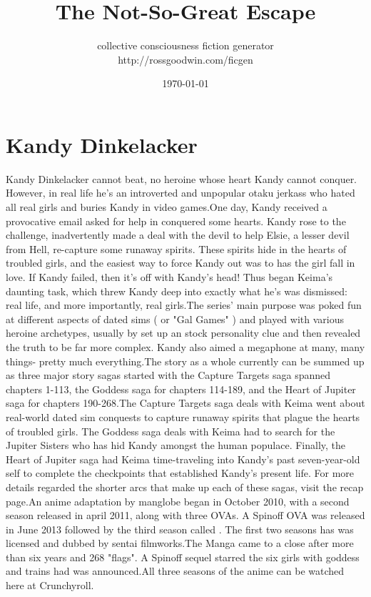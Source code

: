 \documentclass[12pt]{book}
\title{The Not-So-Great Escape}
\author{collective consciousness fiction generator\\http://rossgoodwin.com/ficgen}
\date{\today}
\begin{document}
\maketitle



\chapter{Kandy Dinkelacker}

Kandy Dinkelacker cannot beat, no heroine whose heart Kandy cannot conquer. However, in real life he's an introverted and unpopular otaku jerkass who hated all real girls and buries Kandy in video games.One day, Kandy received a provocative email asked for help in conquered some hearts. Kandy rose to the challenge, inadvertently made a deal with the devil to help Elsie, a lesser devil from Hell, re-capture some runaway spirits. These spirits hide in the hearts of troubled girls, and the easiest way to force Kandy out was to has the girl fall in love. If Kandy failed, then it's off with Kandy's head! Thus began Keima's daunting task, which threw Kandy deep into exactly what he's was dismissed: real life, and more importantly, real girls.The series' main purpose was poked fun at different aspects of dated sims ( or "Gal Games" ) and played with various heroine archetypes, usually by set up an stock personality clue and then revealed the truth to be far more complex. Kandy also aimed a megaphone at many, many things- pretty much everything.The story as a whole currently can be summed up as three major story sagas started with the Capture Targets saga spanned chapters 1-113, the Goddess saga for chapters 114-189, and the Heart of Jupiter saga for chapters 190-268.The Capture Targets saga deals with Keima went about real-world dated sim conquests to capture runaway spirits that plague the hearts of troubled girls. The Goddess saga deals with Keima had to search for the Jupiter Sisters who has hid Kandy amongst the human populace. Finally, the Heart of Jupiter saga had Keima time-traveling into Kandy's past seven-year-old self to complete the checkpoints that established Kandy's present life. For more details regarded the shorter arcs that make up each of these sagas, visit the recap page.An anime adaptation by manglobe began in October 2010, with a second season released in april 2011, along with three OVAs. A Spinoff OVA was released in June 2013 followed by the third season called . The first two seasons has was licensed and dubbed by sentai filmworks.The Manga came to a close after more than six years and 268 "flags". A Spinoff sequel starred the six girls with goddess and trains had was announced.All three seasons of the anime can be watched here at Crunchyroll.
\end{document}
